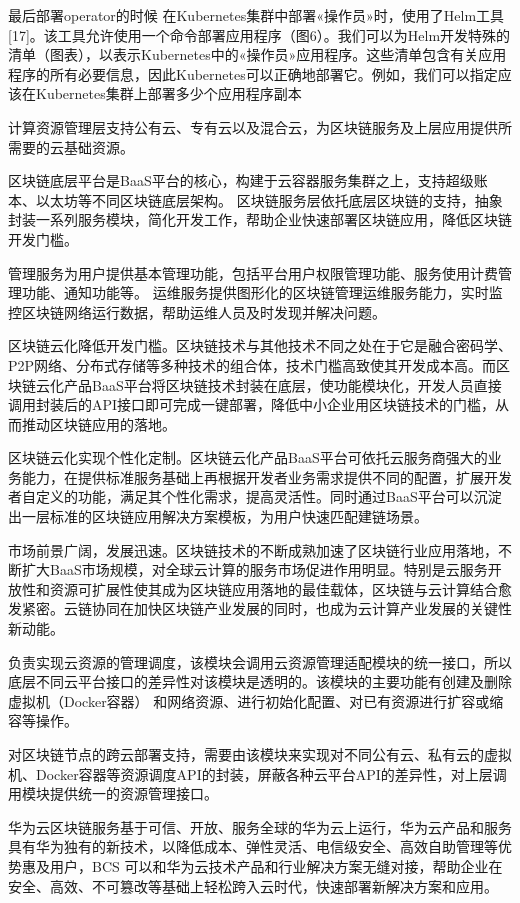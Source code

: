 最后部署operator的时候
在Kubernetes集群中部署«操作员»时，使用了Helm工具[17]。该工具允许使用一个命令部署应用程序（图6）。我们可以为Helm开发特殊的清单（图表），以表示Kubernetes中的«操作员»应用程序。这些清单包含有关应用程序的所有必要信息，因此Kubernetes可以正确地部署它。例如，我们可以指定应该在Kubernetes集群上部署多少个应用程序副本

计算资源管理层支持公有云、专有云以及混合云，为区块链服务及上层应用提供所需要的云基础资源。

区块链底层平台是BaaS平台的核心，构建于云容器服务集群之上，支持超级账本、以太坊等不同区块链底层架构。
区块链服务层依托底层区块链的支持，抽象封装一系列服务模块，简化开发工作，帮助企业快速部署区块链应用，降低区块链开发门槛。

管理服务为用户提供基本管理功能，包括平台用户权限管理功能、服务使用计费管理功能、通知功能等。
运维服务提供图形化的区块链管理运维服务能力，实时监控区块链网络运行数据，帮助运维人员及时发现并解决问题。

区块链云化降低开发门槛。区块链技术与其他技术不同之处在于它是融合密码学、P2P网络、分布式存储等多种技术的组合体，技术门槛高致使其开发成本高。而区块链云化产品BaaS平台将区块链技术封装在底层，使功能模块化，开发人员直接调用封装后的API接口即可完成一键部署，降低中小企业用区块链技术的门槛，从而推动区块链应用的落地。

区块链云化实现个性化定制。区块链云化产品BaaS平台可依托云服务商强大的业务能力，在提供标准服务基础上再根据开发者业务需求提供不同的配置，扩展开发者自定义的功能，满足其个性化需求，提高灵活性。同时通过BaaS平台可以沉淀出一层标准的区块链应用解决方案模板，为用户快速匹配建链场景。

市场前景广阔，发展迅速。区块链技术的不断成熟加速了区块链行业应用落地，不断扩大BaaS市场规模，对全球云计算的服务市场促进作用明显。特别是云服务开放性和资源可扩展性使其成为区块链应用落地的最佳载体，区块链与云计算结合愈发紧密。云链协同在加快区块链产业发展的同时，也成为云计算产业发展的关键性新动能。

负责实现云资源的管理调度，该模块会调用云资源管理适配模块的统一接口，所以底层不同云平台接口的差异性对该模块是透明的。该模块的主要功能有创建及删除虚拟机（Docker容器） 和网络资源、进行初始化配置、对已有资源进行扩容或缩容等操作。

对区块链节点的跨云部署支持，需要由该模块来实现对不同公有云、私有云的虚拟机、Docker容器等资源调度API的封装，屏蔽各种云平台API的差异性，对上层调用模块提供统一的资源管理接口。

华为云区块链服务基于可信、开放、服务全球的华为云上运行，华为云产品和服务具有华为独有的新技术，以降低成本、弹性灵活、电信级安全、高效自助管理等优势惠及用户，BCS 可以和华为云技术产品和行业解决方案无缝对接，帮助企业在安全、高效、不可篡改等基础上轻松跨入云时代，快速部署新解决方案和应用。
